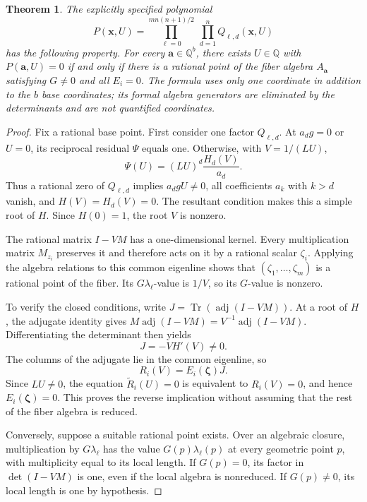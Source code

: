 \documentclass[11pt]{article}
\newtheorem{theorem}{Theorem}[section]
\theoremstyle{definition}
\begin{document}
\begin{theorem}\label{thm:explicit-guarded-finite-algebra}
The explicitly specified polynomial
\[
 P(\mathbf x,U)=
 \prod_{\ell=0}^{m n(n+1)/2}\ \prod_{d=1}^{n} Q_{\ell,d}(\mathbf x,U)
\]
has the following property. For every $\mathbf a\in\mathbb Q^b$,
there exists $U\in\mathbb Q$ with $P(\mathbf a,U)=0$ if and only if
there is a rational point of the fiber algebra $A_{\mathbf a}$ satisfying
$G\ne0$ and all $E_i=0$. The formula uses only one coordinate in addition
to the $b$ base coordinates; its formal algebra generators are eliminated
by the determinants and are not quantified coordinates.
\end{theorem}
\begin{proof}
Fix a rational base point. First consider one factor $Q_{\ell,d}$.
At $a_dg=0$ or $U=0$, its reciprocal residual $\Psi$ equals one.
Otherwise, with $V=1/(LU)$,
\[
 \Psi(U)=(LU)^d\frac{H_d(V)}{a_d}.
\]
Thus a rational zero of $Q_{\ell,d}$ implies $a_dgU\ne0$, all
coefficients $a_k$ with $k>d$ vanish, and $H(V)=H_d(V)=0$.
The resultant condition makes this a simple root of $H$. Since
$H(0)=1$, the root $V$ is nonzero.

The rational matrix $I-VM$ has a one-dimensional kernel. Every
multiplication matrix $M_{z_i}$ preserves it and therefore acts on
it by a rational scalar $\zeta_i$. Applying the algebra relations
to this common eigenline shows that $(\zeta_1,\ldots,\zeta_m)$ is
a rational point of the fiber. Its $G\lambda_\ell$-value is $1/V$,
so its $G$-value is nonzero.

To verify the closed conditions, write
$J=\operatorname{Tr}(\operatorname{adj}(I-VM))$. At a root of $H$,
the adjugate identity gives
$M\operatorname{adj}(I-VM)=V^{-1}\operatorname{adj}(I-VM)$.
Differentiating the determinant then yields
\[
 J=-V H'(V)\ne0.
\]
The columns of the adjugate lie in the common eigenline, so
\[
 R_i(V)=E_i(\boldsymbol\zeta)J.
\]
Since $LU\ne0$, the equation $\widetilde R_i(U)=0$ is equivalent
to $R_i(V)=0$, and hence $E_i(\boldsymbol\zeta)=0$. This proves
the reverse implication without assuming that the rest of the fiber
algebra is reduced.

Conversely, suppose a suitable rational point exists. Over an
algebraic closure, multiplication by $G\lambda_\ell$ has the
value $G(p)\lambda_\ell(p)$ at every geometric point $p$, with
multiplicity equal to its local length. If $G(p)=0$, its factor
in $\det(I-VM)$ is one, even if the local algebra is nonreduced.
If $G(p)\ne0$, its local length is one by hypothesis.


\end{proof}
\end{document}

